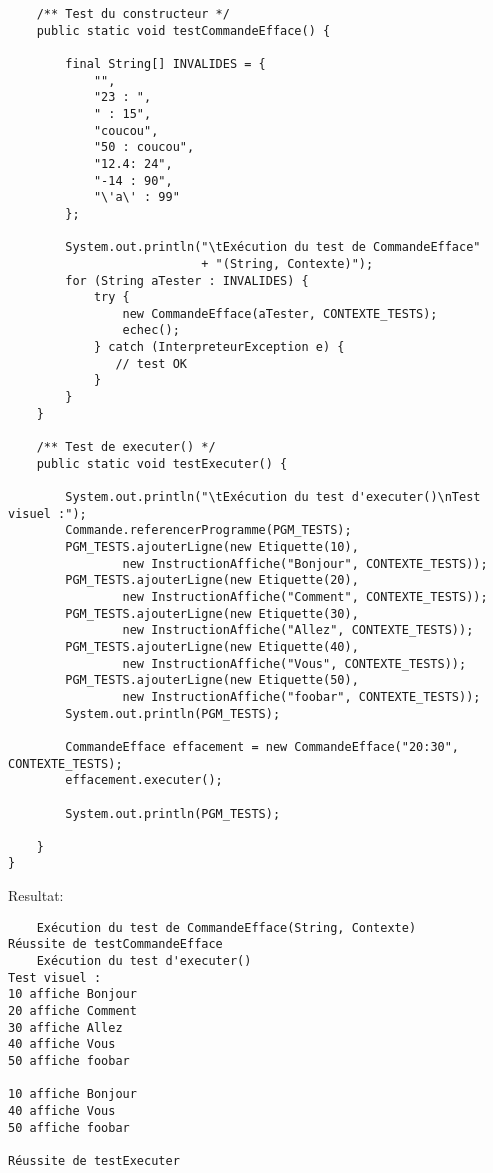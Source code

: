 \begin{enum}
\begin{verbatim}
    /** Test du constructeur */
    public static void testCommandeEfface() {
        
        final String[] INVALIDES = {
            "",
            "23 : ",
            " : 15",
            "coucou",
            "50 : coucou",
            "12.4: 24",
            "-14 : 90",
            "\'a\' : 99"
        };
        
        System.out.println("\tExécution du test de CommandeEfface"
                           + "(String, Contexte)");
        for (String aTester : INVALIDES) {
            try {
                new CommandeEfface(aTester, CONTEXTE_TESTS);
                echec();
            } catch (InterpreteurException e) {
               // test OK
            }
        }
    }
    
    /** Test de executer() */
    public static void testExecuter() {
        
        System.out.println("\tExécution du test d'executer()\nTest visuel :");
        Commande.referencerProgramme(PGM_TESTS);
        PGM_TESTS.ajouterLigne(new Etiquette(10), 
                new InstructionAffiche("Bonjour", CONTEXTE_TESTS));
        PGM_TESTS.ajouterLigne(new Etiquette(20), 
                new InstructionAffiche("Comment", CONTEXTE_TESTS));
        PGM_TESTS.ajouterLigne(new Etiquette(30), 
                new InstructionAffiche("Allez", CONTEXTE_TESTS));
        PGM_TESTS.ajouterLigne(new Etiquette(40), 
                new InstructionAffiche("Vous", CONTEXTE_TESTS));
        PGM_TESTS.ajouterLigne(new Etiquette(50), 
                new InstructionAffiche("foobar", CONTEXTE_TESTS));
        System.out.println(PGM_TESTS);
        
        CommandeEfface effacement = new CommandeEfface("20:30", CONTEXTE_TESTS);
        effacement.executer();
        
        System.out.println(PGM_TESTS);
        
    }
}
\end{verbatim}
Resultat:
\begin{verbatim}
    Exécution du test de CommandeEfface(String, Contexte)
Réussite de testCommandeEfface
    Exécution du test d'executer()
Test visuel :
10 affiche Bonjour
20 affiche Comment
30 affiche Allez
40 affiche Vous
50 affiche foobar

10 affiche Bonjour
40 affiche Vous
50 affiche foobar

Réussite de testExecuter
\end{verbatim}


\end{enum}
